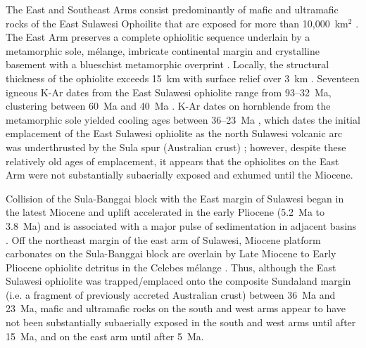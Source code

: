 \documentclass[11pt,letterpaper]{article}
\begin{document}
The East and Southeast Arms consist predominantly of mafic and ultramafic rocks of the East Sulawesi Ophoilite that are exposed for more than 10,000~km$^{2}$ \citep{Monnier1995a}. The East Arm preserves a complete ophiolitic sequence underlain by a metamorphic sole, m\'elange, imbricate continental margin and crystalline basement with a blueschist metamorphic overprint \citep{Silver1983a, Monnier1995a, Parkinson1998a}. Locally, the structural thickness of the ophiolite exceeds 15~km with surface relief over 3~km \citep{Kadarusman2004a}. Seventeen igneous K-Ar dates from the East Sulawesi ophiolite range from 93--32~Ma, clustering between 60~Ma and 40~Ma \citep{Parkinson1998b}. K-Ar dates on hornblende from the metamorphic sole yielded cooling ages between 36--23~Ma \citep{Parkinson1998a, Villeneuve2001a}, which dates the initial emplacement of the East Sulawesi ophiolite as the north Sulawesi volcanic arc was underthrusted by the Sula spur (Australian crust) \citep{Silver1983a, Parkinson1998a}; however, despite these relatively old ages of emplacement, it appears that the ophiolites on the East Arm were not substantially subaerially exposed and exhumed until the Miocene.

Collision of the Sula-Banggai block with the East margin of Sulawesi began in the latest Miocene and uplift accelerated in the early Pliocene (5.2~Ma to 3.8~Ma) and is associated with a major pulse of sedimentation in adjacent basins \citep{Davies1990a, Villeneuve2000a}. Off the northeast margin of the east arm of Sulawesi, Miocene platform carbonates on the Sula-Banggai block are overlain by Late Miocene to Early Pliocene ophiolite detritus in the Celebes m\'elange \citep{Davies1990a}. Thus, although the East Sulawesi ophiolite was trapped/emplaced onto the composite Sundaland margin (i.e. a fragment of previously accreted Australian crust) between 36~Ma and 23~Ma, mafic and ultramafic rocks on the south and west arms appear to have not been substantially subaerially exposed in the south and west arms until after 15~Ma, and on the east arm until after 5~Ma.
\end{document}
